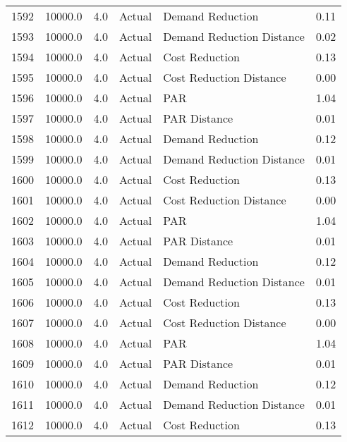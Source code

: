 \begin{longtable}{lrrllr}
1592 &      10000.0 &     4.0 &         Actual &           Demand Reduction &   0.11 \\
1593 &      10000.0 &     4.0 &         Actual &  Demand Reduction Distance &   0.02 \\
1594 &      10000.0 &     4.0 &         Actual &             Cost Reduction &   0.13 \\
1595 &      10000.0 &     4.0 &         Actual &    Cost Reduction Distance &   0.00 \\
1596 &      10000.0 &     4.0 &         Actual &                        PAR &   1.04 \\
1597 &      10000.0 &     4.0 &         Actual &               PAR Distance &   0.01 \\
1598 &      10000.0 &     4.0 &         Actual &           Demand Reduction &   0.12 \\
1599 &      10000.0 &     4.0 &         Actual &  Demand Reduction Distance &   0.01 \\
1600 &      10000.0 &     4.0 &         Actual &             Cost Reduction &   0.13 \\
1601 &      10000.0 &     4.0 &         Actual &    Cost Reduction Distance &   0.00 \\
1602 &      10000.0 &     4.0 &         Actual &                        PAR &   1.04 \\
1603 &      10000.0 &     4.0 &         Actual &               PAR Distance &   0.01 \\
1604 &      10000.0 &     4.0 &         Actual &           Demand Reduction &   0.12 \\
1605 &      10000.0 &     4.0 &         Actual &  Demand Reduction Distance &   0.01 \\
1606 &      10000.0 &     4.0 &         Actual &             Cost Reduction &   0.13 \\
1607 &      10000.0 &     4.0 &         Actual &    Cost Reduction Distance &   0.00 \\
1608 &      10000.0 &     4.0 &         Actual &                        PAR &   1.04 \\
1609 &      10000.0 &     4.0 &         Actual &               PAR Distance &   0.01 \\
1610 &      10000.0 &     4.0 &         Actual &           Demand Reduction &   0.12 \\
1611 &      10000.0 &     4.0 &         Actual &  Demand Reduction Distance &   0.01 \\
1612 &      10000.0 &     4.0 &         Actual &             Cost Reduction &   0.13 \\

\end{longtable}
